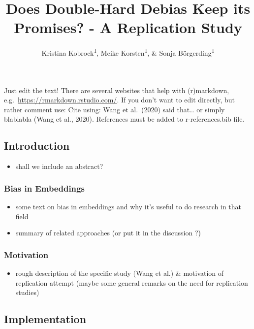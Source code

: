 \documentclass[
  english,
  man]{apa6}
\title{Does Double-Hard Debias Keep its Promises? - A Replication Study}
\author{Kristina Kobrock\textsuperscript{1}, Meike Korsten\textsuperscript{1}, \& Sonja Börgerding\textsuperscript{1}}
\date{}
\affiliation{\vspace{0.5cm}\textsuperscript{1} University of Osnabrück}
\providecommand{\tightlist}{%
  \setlength{\itemsep}{0pt}\setlength{\parskip}{0pt}}
\begin{document}
\maketitle

Just edit the text! There are several websites that help with (r)markdown, e.g.~\url{https://rmarkdown.rstudio.com/}.
If you don't want to edit directly, but rather comment use:
Cite using: Wang et al.~(2020) said that\ldots{} or simply blablabla (Wang et al., 2020). References must be added to r-references.bib file.

\hypertarget{introduction}{%
\subsection{Introduction}\label{introduction}}

\begin{itemize}
\tightlist
\item
  shall we include an abstract?
\end{itemize}

\hypertarget{bias-in-embeddings}{%
\subsubsection{Bias in Embeddings}\label{bias-in-embeddings}}

\begin{itemize}
\tightlist
\item
  some text on bias in embeddings and why it's useful to do research in that field
\item
  summary of related approaches (or put it in the discussion ?)
\end{itemize}

\hypertarget{motivation}{%
\subsubsection{Motivation}\label{motivation}}

\begin{itemize}
\tightlist
\item
  rough description of the specific study (Wang et al.) \& motivation of replication attempt (maybe some general remarks on the need for replication studies)
\end{itemize}

\hypertarget{implementation}{%
\subsection{Implementation}\label{implementation}}
\end{document}

